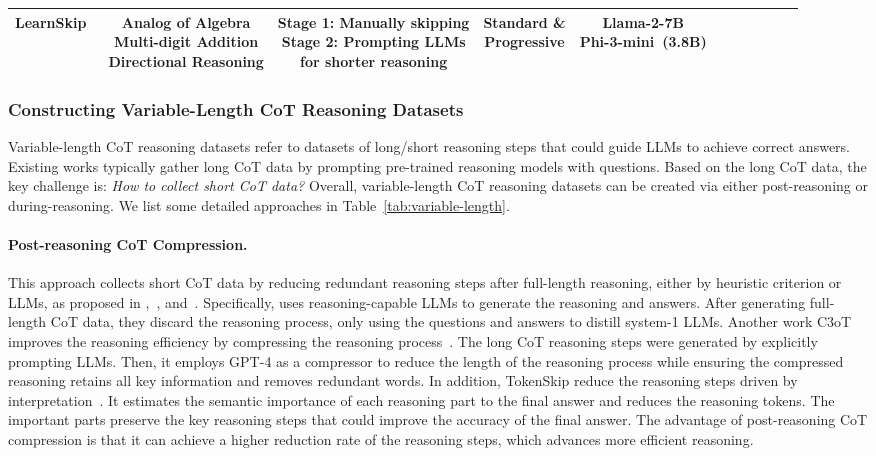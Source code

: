 \begin{table}[ht]
{\begin{tabular}{l|cccccccccc}
\midrule
LearnSkip~\cite{liu2024can} & \makecell[c]{Analog of Algebra \\ Multi-digit Addition \\ Directional Reasoning} & \makecell[c]{Stage 1: Manually skipping \\ Stage 2: Prompting LLMs \\ for shorter reasoning} & \makecell[c]{Standard \& \\ Progressive} & \makecell[c]{Llama-2-7B \\ Phi-3-mini~(3.8B)} \\
\bottomrule
\end{tabular}
}
\end{table}

\subsubsection{Constructing Variable-Length CoT Reasoning Datasets}

%
Variable-length CoT reasoning datasets refer to datasets of long/short reasoning steps that could guide LLMs to achieve correct answers.
%
Existing works typically gather long CoT data by prompting pre-trained reasoning models with questions. Based on the long CoT data, the key challenge is: \textit{How to collect short CoT data?} Overall, variable-length CoT reasoning datasets can be created via either post-reasoning or during-reasoning. We list some detailed approaches in Table~\ref{tab:variable-length}.

\paragraph{\textbf{Post-reasoning CoT Compression.}}
This approach collects short CoT data by reducing redundant reasoning steps after full-length reasoning, either by heuristic criterion or LLMs, as proposed in \cite{yu2024distilling},~\cite{kang2024c3ot}, and~\cite{xia2025tokenskip}.  
Specifically, \cite{yu2024distilling} uses reasoning-capable LLMs to generate the reasoning and answers. After generating full-length CoT data, they discard the reasoning process, only using the questions and answers to distill system-1 LLMs.
Another work C3oT improves the reasoning efficiency by compressing the reasoning process~\cite{kang2024c3ot}. The long CoT reasoning steps were generated by explicitly prompting LLMs. Then, it employs GPT-4 as a compressor to reduce the length of the reasoning process while ensuring the compressed reasoning retains all key information and removes redundant words. In addition, TokenSkip reduce the reasoning steps driven by interpretation~\cite{xia2025tokenskip}.
It estimates the semantic importance of each reasoning part to the final answer and reduces the reasoning tokens.
The important parts preserve the key reasoning steps that could improve the accuracy of the final answer.
The advantage of post-reasoning CoT compression is that it can achieve a higher reduction rate of the reasoning steps, which advances more efficient reasoning.

